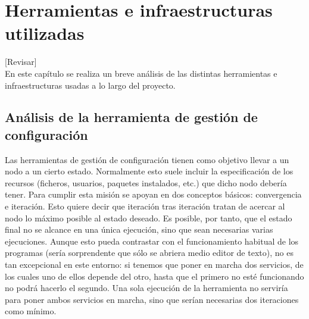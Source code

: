 \chapter{Herramientas e infraestructuras utilizadas}
\label{cap:analisis}

[Revisar]\\

En este capítulo se realiza un breve análisis de las distintas herramientas e infraestructuras usadas a lo largo del proyecto.


\section{Análisis de la herramienta de gestión de configuración}

Las herramientas de gestión de configuración tienen como objetivo llevar a un nodo a un cierto estado. Normalmente esto suele incluir la especificación de los recursos (ficheros, usuarios, paquetes instalados, etc.) que dicho nodo debería tener. Para cumplir esta misión se apoyan en dos conceptos básicos: convergencia e iteración. Esto quiere decir que iteración tras iteración tratan de acercar al nodo lo máximo posible al estado deseado. Es posible, por tanto, que el estado final no se alcance en una única ejecución, sino que sean necesarias varias ejecuciones. Aunque esto pueda contrastar con el funcionamiento habitual de los programas (sería sorprendente que sólo se abriera medio editor de texto), no es tan excepcional en este entorno: si tenemos que poner en marcha dos servicios, de los cuales uno de ellos depende del otro, hasta que el primero no esté funcionando no podrá hacerlo el segundo. Una sola ejecución de la herramienta no serviría para poner ambos servicios en marcha, sino que serían necesarias dos iteraciones como mínimo. \\


